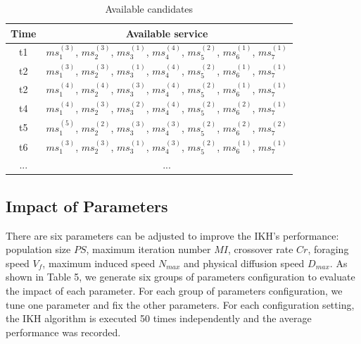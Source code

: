 \documentclass[10pt,journal,compsoc]{IEEEtran}
\begin{document}
\begin{table}[!t]
\renewcommand{\arraystretch}{1.3}
\caption{Available candidates}
\label{table_example}
\centering
\begin{tabular}{c c}
\hline
\bfseries Time & \bfseries Available service\\
\hline
t1     & $ms_1^{(3)}$, $ms_2^{(3)}$, $ms_3^{(1)}$, $ms_4^{(4)}$, $ms_5^{(2)}$, $ms_6^{(1)}$, $ms_7^{(1)}$\\
t2     & $ms_1^{(3)}$, $ms_2^{(3)}$, $ms_3^{(1)}$, $ms_4^{(4)}$, $ms_5^{(2)}$, $ms_6^{(1)}$, $ms_7^{(1)}$\\
t2     & $ms_1^{(4)}$, $ms_2^{(4)}$, $ms_3^{(3)}$, $ms_4^{(4)}$, $ms_5^{(2)}$, $ms_6^{(1)}$, $ms_7^{(1)}$\\
t4     & $ms_1^{(4)}$, $ms_2^{(3)}$, $ms_3^{(2)}$, $ms_4^{(4)}$, $ms_5^{(2)}$, $ms_6^{(2)}$, $ms_7^{(1)}$\\
t5     & $ms_1^{(5)}$, $ms_2^{(2)}$, $ms_3^{(3)}$, $ms_4^{(3)}$, $ms_5^{(2)}$, $ms_6^{(2)}$, $ms_7^{(2)}$\\
t6     & $ms_1^{(3)}$, $ms_2^{(3)}$, $ms_3^{(1)}$, $ms_4^{(3)}$, $ms_5^{(2)}$, $ms_6^{(1)}$, $ms_7^{(1)}$\\
... & ...\\
\hline
\end{tabular}
\end{table}


\subsection{Impact of Parameters}
There are six parameters can be adjusted to improve the IKH's performance: population size $PS$, maximum iteration number $MI$, crossover rate $Cr$, foraging speed $V_f$, maximum induced speed $N_{max}$ and physical diffusion speed $D_{max}$. As shown in Table 5, we generate six groups of parameters configuration to evaluate the impact of each parameter. For each group of parameters configuration, we tune one parameter and fix the other parameters. For each configuration setting, the IKH algorithm is executed 50 times independently and the average performance was recorded.
\end{document}
